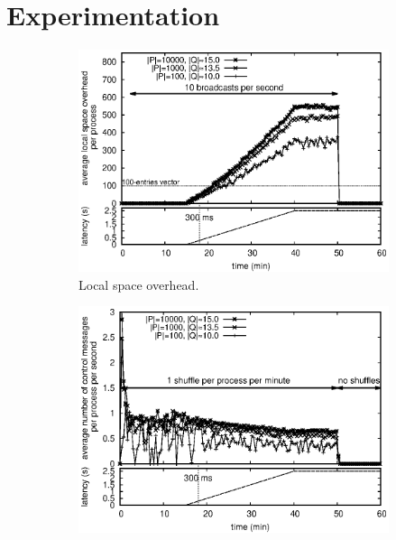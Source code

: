 
\section{Experimentation}
\label{sec:experimentation}


\begin{figure}
  \begin{center}
    \begin{subfigure}[t]{0.495\textwidth}
    \includegraphics[width=1\textwidth]{./img/overhead.eps}
    \caption{\label{fig:overhead}Local space overhead.}
    \end{subfigure}
    \begin{subfigure}[t]{0.495\textwidth}      
      \includegraphics[width=1\textwidth]{./img/controlmessages.eps}

\end{subfigure}
\end{center}
\end{figure}
